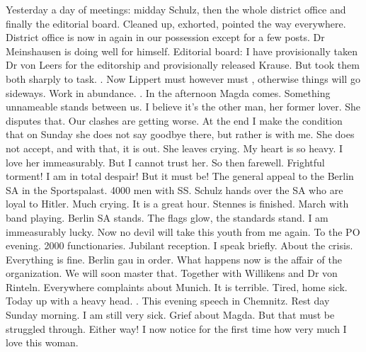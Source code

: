 Yesterday a day of meetings: midday Schulz, then the whole district office and finally the editorial board. Cleaned up, exhorted, pointed the way everywhere. District office is now in again in our possession except for a few posts. Dr Meinshausen is doing well for himself. Editorial board: I have provisionally taken Dr von Leers for the editorship and provisionally released Krause. But took them both sharply to task. . Now Lippert must however must , otherwise things will go sideways. Work in abundance. . In the afternoon Magda comes. Something unnameable stands between us. I believe it's the other man, her former lover. She disputes that. Our clashes are getting worse. At the end I make the condition that on Sunday she does not say goodbye there, but rather is with me. She does not accept, and with that, it is out. She leaves crying. My heart is so heavy. I love her immeasurably. But I cannot trust her. So then farewell. Frightful torment! I am in total despair! But it must be! The general appeal to the Berlin SA in the Sportspalast. 4000 men with SS. Schulz hands over the SA who are loyal to Hitler. Much crying. It is a great hour. Stennes is finished. March with band playing. Berlin SA stands. The flags glow, the standards stand. I am immeasurably lucky. Now no devil will take this youth from me again. To the PO evening. 2000 functionaries. Jubilant reception. I speak briefly. About the crisis. Everything is fine. Berlin gau in order. What happens now is the affair of the organization. We will soon master that. Together with Willikens and Dr von Rinteln. Everywhere complaints about Munich. It is terrible. Tired, home sick. Today up with a heavy head. . This evening speech in Chemnitz. Rest day Sunday morning. I am still very sick. Grief about Magda. But that must be struggled through. Either way! I now notice for the first time how very much I love this woman.

